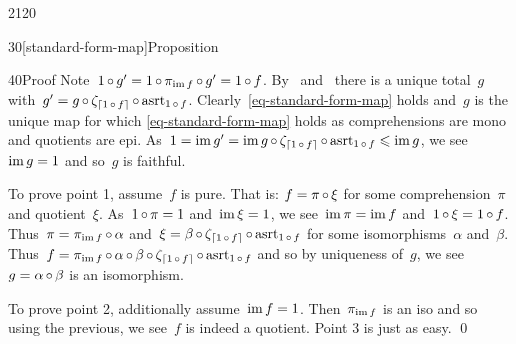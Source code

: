 \begin{parsec}{2120}
\begin{point}{30}[standard-form-map]{Proposition}
\begin{point}{40}{Proof}
Note~$1 \mathop{\circ} g' = 1 \mathop{\circ} \pi_{\operatorname{im} f} \mathop{\circ} g' = 1 \mathop{\circ} f$.
By~ and~
    there is a unique total~$g$ with~$g' = g \mathop{\circ} \zeta_{\left\lceil1 \mathop{\circ} f\right\rceil} \mathop{\circ} \mathrm{asrt}_{1 \mathop{\circ} f}$.
Clearly~\eqref{eq-standard-form-map} holds
and~$g$ is the unique map
    for which \eqref{eq-standard-form-map} holds
    as  comprehensions are mono and quotients are epi.
    As~$1 = \operatorname{im} g' = \operatorname{im} g \mathop{\circ} \zeta_{\left\lceil1 \mathop{\circ} f\right\rceil}
            \mathop{\circ} \mathrm{asrt}_{1 \mathop{\circ} f} \leqslant \operatorname{im} g$,
            we see~$\operatorname{im} g = 1$ and so~$g$ is faithful.

To prove point 1, assume~$f$ is pure.
That is: $f = \pi \mathop{\circ} \xi$ for some comprehension~$\pi$
        and quotient~$\xi$.
As~$1 \mathop{\circ} \pi=1$ and~$\operatorname{im} \xi = 1$,
    we see~$\operatorname{im} \pi = \operatorname{im} f$ and~$1 \mathop{\circ} \xi = 1\mathop{\circ} f$.
Thus~$\pi = \pi_{\operatorname{im} f} \mathop{\circ} \alpha$
    and~$\xi = \beta \mathop{\circ} \zeta_{\left\lceil1 \mathop{\circ} f\right\rceil}
                \mathop{\circ} \mathrm{asrt}_{1 \mathop{\circ} f}$
        for some isomorphisms~$\alpha$ and~$\beta$.
Thus~$f = \pi_{\operatorname{im} f} \mathop{\circ} \alpha \mathop{\circ} \beta
                \mathop{\circ} \zeta_{\left\lceil1 \mathop{\circ} f\right\rceil}
                \mathop{\circ} \mathrm{asrt}_{1 \mathop{\circ} f}$
        and so by uniqueness of~$g$,
        we see~$g = \alpha \mathop{\circ} \beta$ is an isomorphism.

To prove point 2, additionally assume~$\operatorname{im} f= 1$.
Then~$\pi_{\operatorname{im} f}$ is an iso and so
using the previous, we see~$f$ is indeed a quotient.
Point 3 is just as easy. \qed
\end{point}
\end{point}
\end{parsec}

